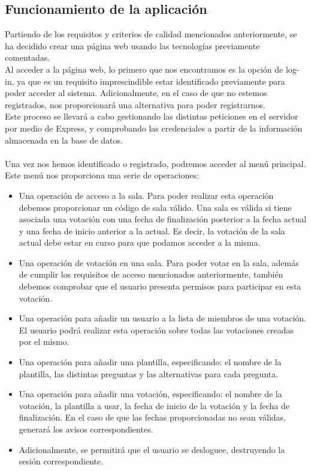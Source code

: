 \documentclass{article}
\begin{document}
 	\subsection{Funcionamiento de la aplicación}
 	Partiendo de los requisitos y criterios de calidad mencionados anteriormente, se ha decidido crear una página web usando las tecnologías previamente comentadas. \\
 	Al acceder a la página web, lo primero que nos encontramos es la opción de log-in, ya que es un requisito imprescindible estar identificado previamente para poder acceder al sistema. Adicionalmente, en el caso de que no estemos registrados, nos proporcionará una alternativa para poder registrarnos. \\
 	Este proceso se llevará a cabo gestionando las distintas peticiones en el servidor por medio de Express, y comprobando las credenciales a partir de la información almacenada en la base de datos. \\ ~\\
 	
 	Una vez nos hemos identificado o registrado, podremos acceder al menú principal. Este menú nos proporciona una serie de operaciones:
 	\begin{itemize}
 		\item Una operación de acceso a la sala. Para poder realizar esta operación debemos proporcionar un código de sala válido. Una sala es válida si tiene asociada una votación con una fecha de finalización posterior a la fecha actual y una fecha de inicio anterior a la actual. Es decir, la votación de la sala actual debe estar en curso para que podamos acceder a la misma.
 		
 		\item Una operación de votación en una sala. Para poder votar en la sala, además de cumplir los requisitos de acceso mencionados anteriormente, también debemos comprobar que el usuario presenta permisos para participar en esta votación.
 		
 		\item Una operación para añadir un usuario a la lista de miembros de una votación. El usuario podrá realizar esta operación sobre todas las votaciones creadas por el mismo.
 		
 		\item Una operación para añadir una plantilla, especificando: el nombre de la plantilla, las distintas preguntas y las alternativas para cada pregunta.
 		
 		\item Una operación para añadir una votación, especificando: el nombre de la votación, la plantilla a usar, la fecha de inicio de la votación y la fecha de finalización. En el caso de que las fechas proporcionadas no sean válidas, generará los avisos correspondientes.
 		
 		\item Adicionalmente, se permitirá que el usuario se desloguee, destruyendo la sesión correspondiente.
 	\end{itemize}
 
\end{document}
